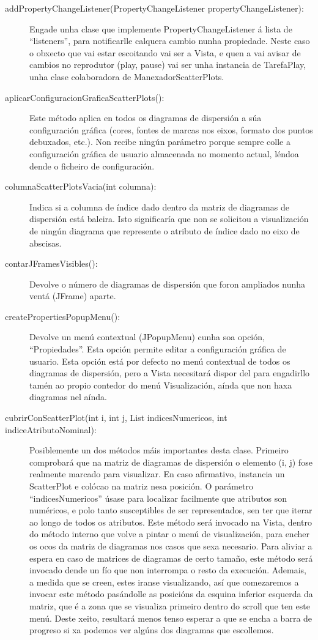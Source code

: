 \begin{description}
\begin{description}
\item[addPropertyChangeListener(PropertyChangeListener propertyChangeListener):] \hfill
Engade unha clase que implemente PropertyChangeListener á lista de ``listeners'', para notificarlle calquera cambio nunha propiedade. Neste caso o obxecto que vai estar escoitando vai ser a Vista, e quen a vai avisar de cambios no reprodutor (play, pause) vai ser unha instancia de TarefaPlay, unha clase colaboradora de ManexadorScatterPlots.
\item[aplicarConfiguracionGraficaScatterPlots():] \hfill
Este método aplica en todos os diagramas de dispersión a súa configuración gráfica (cores, fontes de marcas nos eixos, formato dos puntos debuxados, etc.). Non recibe ningún parámetro porque sempre colle a configuración gráfica de usuario almacenada no momento actual, léndoa dende o ficheiro de configuración.
\item[columnaScatterPlotsVacia(int columna):] \hfill
Indica si a columna de índice dado dentro da matriz de diagramas de dispersión está baleira. Isto significaría que non se solicitou a visualización de ningún diagrama que represente o atributo de índice dado no eixo de abscisas.
\item[contarJFramesVisibles():] \hfill
Devolve o número de diagramas de dispersión que foron ampliados nunha ventá (JFrame) aparte.
\item[createPropertiesPopupMenu():] \hfill
Devolve un menú contextual (JPopupMenu) cunha soa opción, ``Propiedades''. Esta opción permite editar a configuración gráfica de usuario. Esta opción está por defecto no menú contextual de todos os diagramas de dispersión, pero a Vista necesitará dispor del para engadirllo tamén ao propio contedor do menú Visualización, aínda que non haxa diagramas nel aínda.
\item[cubrirConScatterPlot(int i, int j, List indicesNumericos, int indiceAtributoNominal):] \hfill
Posiblemente un dos métodos máis importantes desta clase. Primeiro comprobará que na matriz de diagramas de dispersión o elemento (i, j) fose realmente marcado para visualizar. En caso afirmativo, instancia un ScatterPlot e colócao na matriz nesa posición. O parámetro ``indicesNumericos'' úsase para localizar facilmente que atributos son numéricos, e polo tanto susceptibles de ser representados, sen ter que iterar ao longo de todos os atributos.
Este método será invocado na Vista, dentro do método interno que volve a pintar o menú de visualización, para encher os ocos da matriz de diagramas nos casos que sexa necesario. Para aliviar a espera en caso de matrices de diagramas de certo tamaño, este método será invocado dende un fío que non interrompa o resto da execución. Ademais, a medida que se creen, estes iranse visualizando, así que comezaremos a invocar este método pasándolle as posicións da esquina inferior esquerda da matriz, que é a zona que se visualiza primeiro dentro do scroll que ten este menú. Deste xeito, resultará menos tenso esperar a que se encha a barra de progreso si xa podemos ver algúns dos diagramas que escollemos.

\end{description}
\end{description}
